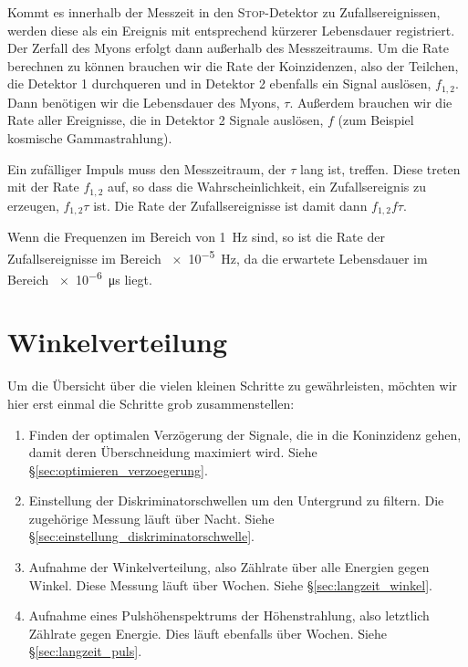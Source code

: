 \documentclass[11pt, ngerman, fleqn, DIV=15, headinclude, BCOR=2cm]{scrreprt}
\begin{document}
Kommt es innerhalb der Messzeit in den \textsc{Stop}-Detektor zu
Zufallsereignissen, werden diese als ein Ereignis mit entsprechend kürzerer
Lebensdauer registriert. Der Zerfall des Myons erfolgt dann außerhalb des
Messzeitraums. Um die Rate berechnen zu können brauchen wir die Rate der
Koinzidenzen, also der Teilchen, die Detektor 1 durchqueren und in Detektor 2
ebenfalls ein Signal auslösen, $f_{1,2}$. Dann benötigen wir die Lebensdauer
des Myons, $\tau$. Außerdem brauchen wir die Rate aller Ereignisse, die in
Detektor 2 Signale auslösen, $f$ (zum Beispiel kosmische Gammastrahlung).

Ein zufälliger Impuls muss den Messzeitraum, der $\tau$ lang ist, treffen.
Diese treten mit der Rate $f_{1,2}$ auf, so dass die Wahrscheinlichkeit, ein
Zufallsereignis zu erzeugen, $f_{1,2} \tau$ ist. Die Rate der Zufallsereignisse
ist damit dann $f_{1,2} f \tau$.

Wenn die Frequenzen im Bereich von \SI{1}{\hertz} sind, so ist die Rate der
Zufallsereignisse im Bereich \SI{e-5}{\hertz}, da die erwartete Lebensdauer im
Bereich \SI{e-6}{\micro\second} liegt.


\chapter{Winkelverteilung}

Um die Übersicht über die vielen kleinen Schritte zu gewährleisten, möchten wir
hier erst einmal die Schritte grob zusammenstellen:

\begin{enumerate}
    \item
        Finden der optimalen Verzögerung der Signale, die in die Koninzidenz
        gehen, damit deren Überschneidung maximiert wird. Siehe
        §\ref{sec:optimieren_verzoegerung}.

    \item
        Einstellung der Diskriminatorschwellen um den Untergrund zu filtern.
        Die zugehörige Messung läuft über Nacht. Siehe
        §\ref{sec:einstellung_diskriminatorschwelle}.

    \item
        Aufnahme der Winkelverteilung, also Zählrate über alle Energien gegen
        Winkel. Diese Messung läuft über Wochen. Siehe
        §\ref{sec:langzeit_winkel}.

    \item
        Aufnahme eines Pulshöhenspektrums der Höhenstrahlung, also letztlich
        Zählrate gegen Energie. Dies läuft ebenfalls über Wochen. Siehe
        §\ref{sec:langzeit_puls}.
\end{enumerate}
\end{document}
